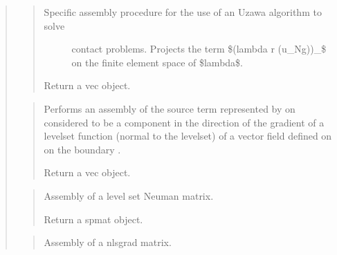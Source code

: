 \documentclass[a4paper,11pt,english]{sphinxmanual}
\begin{document}
\begin{quote}
\begin{quote}
\begin{description}
\item[{Specific assembly procedure for the use of an Uzawa algorithm to solve}] \leavevmode
contact problems. Projects the term \$\sphinxhyphen{}(lambda \sphinxhyphen{} r (u\_N\sphinxhyphen{}g))\_\sphinxhyphen{}\$ on the
finite element space of \$lambda\$.

\end{description}

Return a vec object.
\end{quote}

\begin{quote}

Performs an assembly of the source term represented by 
on  considered to be a component in the direction of the
gradient of a levelset function (normal to the levelset) of a vector
field defined on  on the boundary .

Return a vec object.
\end{quote}

\begin{quote}

Assembly of a level set Neuman  matrix.

Return a spmat object.
\end{quote}

\begin{quote}

Assembly of a nlsgrad matrix.


\end{quote}
\end{quote}
\end{document}
